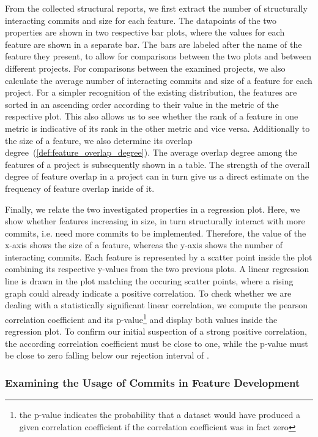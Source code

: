 From the collected structural reports, we first extract the number of structurally interacting commits and size for each feature.
The datapoints of the two properties are shown in two respective bar plots, where the values for each feature are shown in a separate bar.
The bars are labeled after the name of the feature they present, to allow for comparisons between the two plots and between different projects.
For comparisons between the examined projects, we also calculate the average number of interacting commits and size of a feature for each project.
For a simpler recognition of the existing distribution, the features are sorted in an ascending order according to their value in the metric of the respective plot.
This also allows us to see whether the rank of a feature in one metric is indicative of its rank in the other metric and vice versa.
Additionally to the size of a feature, we also determine its overlap degree~(\autoref{def:feature_overlap_degree}).
The average overlap degree among the features of a project is subsequently shown in a table.
The strength of the overall degree of feature overlap in a project can in turn give us a direct estimate on the frequency of feature overlap inside of it.

Finally, we relate the two investigated properties in a regression plot.
Here, we show whether features increasing in size, in turn structurally interact with more commits, i.e. need more commits to be implemented.
Therefore, the value of the x-axis shows the size of a feature, whereas the y-axis shows the number of interacting commits.
Each feature is represented by a scatter point inside the plot combining its respective y-values from the two previous plots.
A linear regression line is drawn in the plot matching the occuring scatter points, where a rising graph could already indicate a positive correlation.
To check whether we are dealing with a statistically significant linear correlation, we compute the pearson correlation coefficient and its p-value\footnote{the p-value indicates the probability that a dataset would have produced a given correlation coefficient if the correlation coefficient was in fact zero} and display both values inside the regression plot.
To confirm our initial suspection of a strong positive correlation, the according correlation coefficient must be close to one, while the p-value must be close to zero falling below our rejection interval of .

\subsubsection*{Examining the Usage of Commits in Feature Development}

